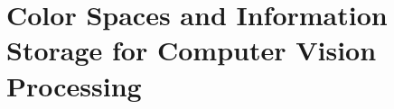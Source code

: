 \newcommand{\uX}{\unitX}             %

\newcommand{\intX}{\text{iX}}        %

\newcommand{\iX}{\intX}              %

\newcommand{\xMax}{\text{xMax}}      %

\newcommand{\xMin}{\text{xMin}}      %

\newcommand{\xRange}{\text{xRange}}  %



\newcommand{\unitY}{\text{uY}}       %

\newcommand{\uY}{\unitY}             %

\newcommand{\intY}{\text{iY}}        %

\newcommand{\iY}{\intY}              %

\newcommand{\yMax}{\text{yMax}}      %

\newcommand{\yMin}{\text{yMin}}      %

\newcommand{\yRange}{\text{yRange}}  %



\newcommand{\unitR}{\text{uR}}

\newcommand{\uR}{\unitR}

\newcommand{\intR}{\text{iR}}

\newcommand{\iR}{\intR}

\newcommand{\discreteR}{\widetilde{\uR}}

\newcommand{\dR}{\discreteR}

\newcommand{\delR}{\delta\uR}

\newcommand{\rRange}{\text{rRange}}  %





\chapter{Color Spaces and Information Storage for Computer Vision Processing} \label{sec:Chap2}




